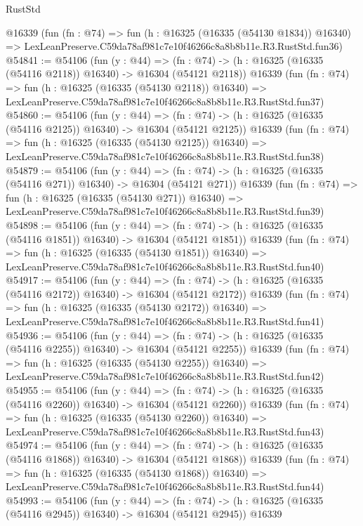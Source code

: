 \begin{lexlean}{RustStd}
\begin{coremodule}
    @16339
    (fun (fn : @74) =>
    fun (h : @16325 (@16335 (@54130 @1834)) @16340) =>
    LexLeanPreserve.C59da78af981c7e10f46266c8a8b8b11e.R3.RustStd.fun36)
@54841 := @54106
    (fun (y : @44) =>
    (fn : @74) -> (h : @16325 (@16335 (@54116 @2118)) @16340) -> @16304 (@54121 @2118))
    @16339
    (fun (fn : @74) =>
    fun (h : @16325 (@16335 (@54130 @2118)) @16340) =>
    LexLeanPreserve.C59da78af981c7e10f46266c8a8b8b11e.R3.RustStd.fun37)
@54860 := @54106
    (fun (y : @44) =>
    (fn : @74) -> (h : @16325 (@16335 (@54116 @2125)) @16340) -> @16304 (@54121 @2125))
    @16339
    (fun (fn : @74) =>
    fun (h : @16325 (@16335 (@54130 @2125)) @16340) =>
    LexLeanPreserve.C59da78af981c7e10f46266c8a8b8b11e.R3.RustStd.fun38)
@54879 := @54106
    (fun (y : @44) =>
    (fn : @74) -> (h : @16325 (@16335 (@54116 @271)) @16340) -> @16304 (@54121 @271))
    @16339
    (fun (fn : @74) =>
    fun (h : @16325 (@16335 (@54130 @271)) @16340) =>
    LexLeanPreserve.C59da78af981c7e10f46266c8a8b8b11e.R3.RustStd.fun39)
@54898 := @54106
    (fun (y : @44) =>
    (fn : @74) -> (h : @16325 (@16335 (@54116 @1851)) @16340) -> @16304 (@54121 @1851))
    @16339
    (fun (fn : @74) =>
    fun (h : @16325 (@16335 (@54130 @1851)) @16340) =>
    LexLeanPreserve.C59da78af981c7e10f46266c8a8b8b11e.R3.RustStd.fun40)
@54917 := @54106
    (fun (y : @44) =>
    (fn : @74) -> (h : @16325 (@16335 (@54116 @2172)) @16340) -> @16304 (@54121 @2172))
    @16339
    (fun (fn : @74) =>
    fun (h : @16325 (@16335 (@54130 @2172)) @16340) =>
    LexLeanPreserve.C59da78af981c7e10f46266c8a8b8b11e.R3.RustStd.fun41)
@54936 := @54106
    (fun (y : @44) =>
    (fn : @74) -> (h : @16325 (@16335 (@54116 @2255)) @16340) -> @16304 (@54121 @2255))
    @16339
    (fun (fn : @74) =>
    fun (h : @16325 (@16335 (@54130 @2255)) @16340) =>
    LexLeanPreserve.C59da78af981c7e10f46266c8a8b8b11e.R3.RustStd.fun42)
@54955 := @54106
    (fun (y : @44) =>
    (fn : @74) -> (h : @16325 (@16335 (@54116 @2260)) @16340) -> @16304 (@54121 @2260))
    @16339
    (fun (fn : @74) =>
    fun (h : @16325 (@16335 (@54130 @2260)) @16340) =>
    LexLeanPreserve.C59da78af981c7e10f46266c8a8b8b11e.R3.RustStd.fun43)
@54974 := @54106
    (fun (y : @44) =>
    (fn : @74) -> (h : @16325 (@16335 (@54116 @1868)) @16340) -> @16304 (@54121 @1868))
    @16339
    (fun (fn : @74) =>
    fun (h : @16325 (@16335 (@54130 @1868)) @16340) =>
    LexLeanPreserve.C59da78af981c7e10f46266c8a8b8b11e.R3.RustStd.fun44)
@54993 := @54106
    (fun (y : @44) =>
    (fn : @74) -> (h : @16325 (@16335 (@54116 @2945)) @16340) -> @16304 (@54121 @2945))
    @16339

\end{coremodule}
\end{lexlean}
